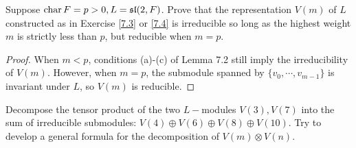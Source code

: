 \begin{ex}
  Suppose $\operatorname{char} F = p > 0, L = \mathfrak{s}\mathfrak{l}(2,F)$. Prove that the representation $V(m)$ of $L$ constructed as in Exercise \ref{7.3} or \ref{7.4} is irreducible so long as the highest weight $m$ is strictly less than $p$, but reducible when $m = p$.
\end{ex}
\begin{proof}
  When $m < p$, conditions (a)-(c) of Lemma 7.2 still imply the irreducibility of $V(m)$. However, when $m = p$, the submodule spanned by $\{v_0,\cdots, v_{m-1}\}$ is invariant under $L$, so $V(m)$ is reducible.
\end{proof}

\begin{ex}
  Decompose the tensor product of the two $L-$modules $V(3), V(7)$ into the sum of irreducible submodules: $V(4)\oplus V(6) \oplus V(8) \oplus V(10)$. Try to develop a general formula for the decomposition of $V(m)\otimes V(n)$.
\end{ex}
